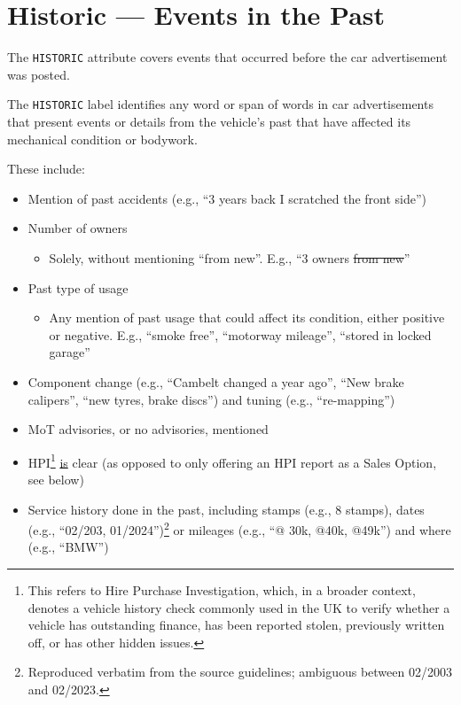 \documentclass[11pt,a4paper]{article}
\newcommand{\lbl}[1]{\texttt{#1}}
\begin{document}
\section*{Historic --- Events in the Past}
The \lbl{HISTORIC} attribute covers events that occurred before the car advertisement was posted.

\begin{tcolorbox}[colback=gray!5!white, colframe=gray!75!black, title=Definition]
The \lbl{HISTORIC} label identifies any word or span of words in car advertisements that present
events or details from the vehicle's past that have affected its mechanical condition or
bodywork.
\end{tcolorbox}

These include:
\begin{itemize}
    \item Mention of past accidents (e.g., ``3 years back I scratched the front side'')
    \item Number of owners
        \begin{itemize}
        \item Solely, without mentioning ``from new''. E.g., ``3 owners \sout{from new}''
        \end{itemize}
    \item Past type of usage
    \begin{itemize}
        \item Any mention of past usage that could affect its condition, either positive or
        negative. E.g., ``smoke free'', ``motorway mileage'', ``stored in locked garage''
    \end{itemize}
    \item Component change (e.g., ``Cambelt changed a year ago'', ``New brake calipers'', ``new
    tyres, brake discs'') and tuning (e.g., ``re-mapping'')
    \item MoT advisories, or no advisories, mentioned
    \item HPI\footnote{This refers to Hire Purchase Investigation, which, in a broader context,
    denotes a vehicle history check commonly used in the UK to verify whether a vehicle has
    outstanding finance, has been reported stolen, previously written off, or has other hidden
    issues.} \underline{is} clear (as opposed to only offering an HPI report as a Sales Option,
    see below)
    \item Service history done in the past, including stamps (e.g., 8 stamps), dates (e.g.,
    ``02/203, 01/2024'')\footnote{Reproduced verbatim from the source guidelines; ambiguous
    between 02/2003 and 02/2023.} or mileages (e.g., ``@ 30k, @40k, @49k'') and where (e.g.,
    ``BMW'')
\end{itemize}
\end{document}

